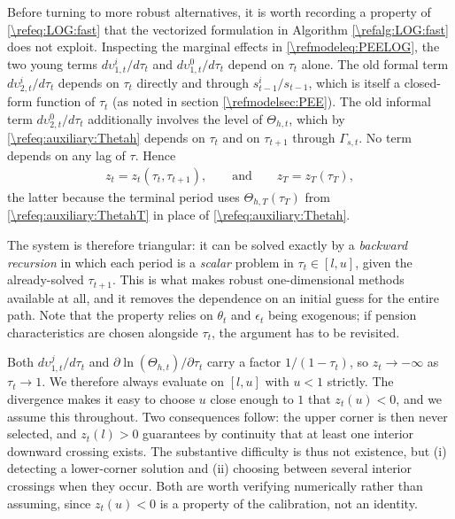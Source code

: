 \documentclass[a4paper]{article}
\begin{document}
Before turning to more robust alternatives, it is worth recording a property of \eqref{\refeq:LOG:fast} that the vectorized formulation in Algorithm \ref{\refalg:LOG:fast} does not exploit. Inspecting the marginal effects in \eqref{\refmodeleq:PEELOG}, the two young terms $d\upsilon_{1,t}^i/d\tau_t$ and $d\upsilon_{1,t}^0/d\tau_t$ depend on $\tau_t$ alone. The old formal term $d\upsilon_{2,t}^i/d\tau_t$ depends on $\tau_t$ directly and through $s_{t-1}^i/s_{t-1}$, which is itself a closed-form function of $\tau_t$ (as noted in section \ref{\refmodelsec:PEE}). The old informal term $d\upsilon_{2,t}^0/d\tau_t$ additionally involves the level of $\Theta_{h,t}$, which by \eqref{\refeq:auxiliary:Thetah} depends on $\tau_t$ and on $\tau_{t+1}$ through $\Gamma_{s,t}$. No term depends on any lag of $\tau$. Hence
\begin{align}\label{\refeq:recursive}
    z_t = z_t\left(\tau_t, \tau_{t+1}\right), \qquad\text{and}\qquad z_T = z_T(\tau_T),
\end{align}
the latter because the terminal period uses $\Theta_{h,T}(\tau_T)$ from \eqref{\refeq:auxiliary:ThetahT} in place of \eqref{\refeq:auxiliary:Thetah}.

The system is therefore triangular: it can be solved exactly by a \emph{backward recursion} in which each period is a \emph{scalar} problem in $\tau_t\in[l,u]$, given the already-solved $\tau_{t+1}$. This is what makes robust one-dimensional methods available at all, and it removes the dependence on an initial guess for the entire path. Note that the property relies on $\theta_t$ and $\epsilon_t$ being exogenous; if pension characteristics are chosen alongside $\tau_t$, the argument has to be revisited.

Both $d\upsilon_{1,t}^j/d\tau_t$ and $\partial \ln(\Theta_{h,t})/\partial\tau_t$ carry a factor $1/(1-\tau_t)$, so $z_t\rightarrow -\infty$ as $\tau_t\rightarrow 1$. We therefore always evaluate on $[l,u]$ with $u<1$ strictly. The divergence makes it easy to choose $u$ close enough to $1$ that $z_t(u)<0$, and we assume this throughout. Two consequences follow: the upper corner is then never selected, and $z_t(l)>0$ guarantees by continuity that at least one interior downward crossing exists. The substantive difficulty is thus not existence, but (i) detecting a lower-corner solution and (ii) choosing between several interior crossings when they occur. Both are worth verifying numerically rather than assuming, since $z_t(u)<0$ is a property of the calibration, not an identity.
\end{document}
